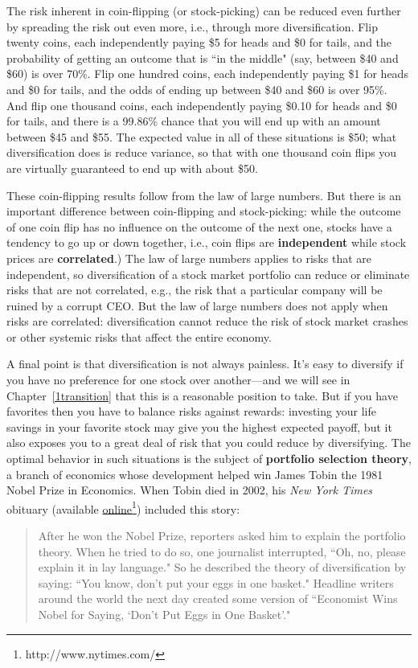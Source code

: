 The risk inherent in coin-flipping (or stock-picking) can be reduced even further by spreading the risk out even more, i.e., through more diversification. Flip twenty coins, each independently paying \$5 for heads and \$0 for tails, and the probability of getting an outcome that is ``in the middle" (say, between \$40 and \$60) is over 70\%. Flip one hundred coins, each independently paying \$1 for heads and \$0 for tails, and the odds of ending up between \$40 and \$60 is over 95\%. And flip one thousand coins, each independently paying \$0.10 for heads and \$0 for tails, and there is a 99.86\% chance that you will end up with an amount between \$45 and \$55. The expected value in all of these situations is \$50; what diversification does is reduce variance, so that with one thousand coin flips you are virtually guaranteed to end up with about \$50.

These coin-flipping results follow from the law of large numbers. But there is an important difference between coin-flipping and stock-picking: while the outcome of one coin flip has no influence on the outcome of the next one, stocks have a tendency to go up or down together, i.e., coin flips are \textbf{independent} while stock prices are \textbf{correlated}.) The law of large numbers applies to risks that are independent, so diversification of a stock market portfolio can reduce or eliminate risks that are not correlated, e.g., the risk that a particular company will be ruined by a corrupt CEO. But the law of large numbers does not apply when risks are correlated: diversification cannot reduce the risk of stock market crashes or other systemic risks that affect the entire economy.

A final point is that diversification is not always painless. It's easy to diversify if you have no preference for one stock over another---and we will see in Chapter~\ref{1transition} that this is a reasonable position to take. But if you have favorites then you have to balance risks against rewards: investing your life savings in your favorite stock may give you the highest expected payoff, but it also exposes you to a great deal of risk that you could reduce by diversifying. The optimal behavior in such situations is the subject of \textbf{portfolio selection theory}, a branch of economics whose development helped win James Tobin the 1981 Nobel Prize in Economics. When Tobin died in 2002, his  \emph{New York Times} obituary  (available  \href{http://query.nytimes.com/gst/fullpage.html?res=9801E6D61539F930A25750C0A9649C8B63}{online}\footnote{http://www.nytimes.com/}) included this story:
\begin{quote}
After he won the Nobel Prize, reporters asked him to explain the portfolio theory. When he tried to do so, one journalist interrupted, ``Oh, no, please explain it in lay language." So he described the theory of diversification by saying: ``You know, don't put your eggs in one basket." Headline writers around the world the next day created some version of ``Economist Wins Nobel for Saying, `Don't Put Eggs in One Basket'."
\end{quote}


